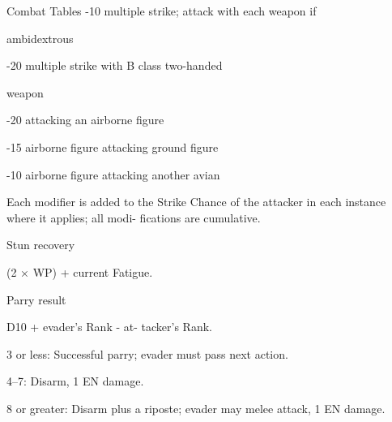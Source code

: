 \begin{Table}{Combat Tables}
-10  multiple strike; attack with each weapon if 

ambidextrous 

-20  multiple strike with B class two-handed 

weapon 

-20  attacking an airborne figure 

-15  airborne figure attacking ground figure 

-10  airborne figure attacking another avian 

Each modifier is added to the Strike Chance of the 
attacker in each instance where it applies; all modi-
fications are cumulative. 

 

Stun recovery  

(2 × WP) + current Fatigue. 

Parry result  

D10 + evader’s Rank - at-
tacker’s Rank.  

3 or less: Successful parry; 
evader must pass next action. 

4–7: Disarm, 1 EN damage. 

8 or greater: Disarm plus a 
riposte; evader may melee 
attack, 1 EN damage. 

\end{Table}
